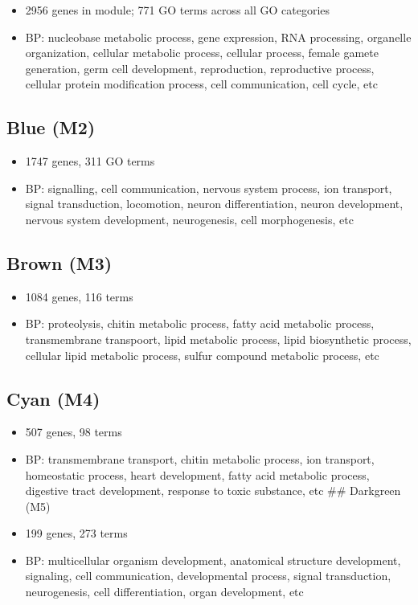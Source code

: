 \documentclass[]{article}
\providecommand{\tightlist}{%
  \setlength{\itemsep}{0pt}\setlength{\parskip}{0pt}}
\begin{document}
\begin{itemize}
\tightlist
\item
  2956 genes in module; 771 GO terms across all GO categories
\item
  BP: nucleobase metabolic process, gene expression, RNA processing,
  organelle organization, cellular metabolic process, cellular process,
  female gamete generation, germ cell development, reproduction,
  reproductive process, cellular protein modification process, cell
  communication, cell cycle, etc
\end{itemize}

\hypertarget{blue-m2}{%
\subsection{Blue (M2)}\label{blue-m2}}

\begin{itemize}
\tightlist
\item
  1747 genes, 311 GO terms
\item
  BP: signalling, cell communication, nervous system process, ion
  transport, signal transduction, locomotion, neuron differentiation,
  neuron development, nervous system development, neurogenesis, cell
  morphogenesis, etc
\end{itemize}

\hypertarget{brown-m3}{%
\subsection{Brown (M3)}\label{brown-m3}}

\begin{itemize}
\tightlist
\item
  1084 genes, 116 terms
\item
  BP: proteolysis, chitin metabolic process, fatty acid metabolic
  process, transmembrane transpoort, lipid metabolic process, lipid
  biosynthetic process, cellular lipid metabolic process, sulfur
  compound metabolic process, etc
\end{itemize}

\hypertarget{cyan-m4}{%
\subsection{Cyan (M4)}\label{cyan-m4}}

\begin{itemize}
\tightlist
\item
  507 genes, 98 terms
\item
  BP: transmembrane transport, chitin metabolic process, ion transport,
  homeostatic process, heart development, fatty acid metabolic process,
  digestive tract development, response to toxic substance, etc \#\#
  Darkgreen (M5)
\item
  199 genes, 273 terms
\item
  BP: multicellular organism development, anatomical structure
  development, signaling, cell communication, developmental process,
  signal transduction, neurogenesis, cell differentiation, organ
  development, etc
\end{itemize}
\end{document}
